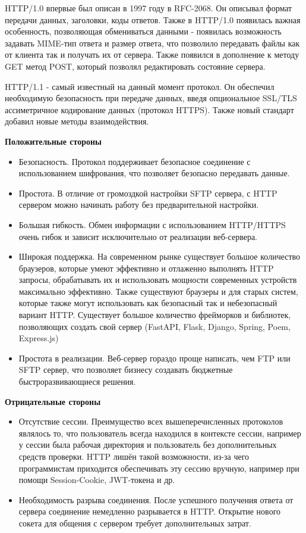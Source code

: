 \documentclass[a4paper,14pt]{extarticle}
\begin{document}
HTTP/1.0 впервые был описан в 1997 году в RFC-2068. Он описывал формат передачи данных, 
заголовки, коды ответов. Также в HTTP/1.0 появилась важная особенность, позволяющая 
обмениваться данными - появилась возможность задавать MIME-тип ответа и размер ответа, 
что позволило передавать файлы как от клиента так и получать их от сервера. Также
появился в дополнение к методу GET метод POST, который позволял редактировать состояние
сервера.

HTTP/1.1 - самый известный на данный момент протокол. Он обеспечил необходимую безопасность
при передаче данных, введя опциональное SSL/TLS ассиметричное кодирование данных (протокол HTTPS). Также
новый стандарт добавил новые методы взаимодействия.

\textbf{Положительные стороны}\\
\begin{itemize}
\item Безопасность. Протокол поддерживает безопасное соединение с использованием шифрования, 
что позволяет безопасно передавать данные.
\item Простота. В отличие от громоздкой настройки SFTP сервера, с HTTP сервером
можно начинать работу без предварительной настройки.
\item Большая гибкость. Обмен информации с использованием HTTP/HTTPS очень гибок и зависит 
исключительно от реализации веб-сервера. 
\item Широкая поддержка. На современном рынке существует большое количество браузеров, которые
умеют эффективно и отлаженно выполнять HTTP запросы, обрабатывать их и использовать мощности 
современных устройств максимально эффективно. Также существуют браузеры и для старых систем, 
которые также могут использовать как безопасный так и небезопасный вариант HTTP. Существует
большое количество фрейморков и библиотек, позволяющих создать свой сервер (FastAPI, Flask, Django, 
Spring, Poem, Express.js)
\item Простота в реализации. Веб-сервер гораздо проще написать, чем FTP или SFTP сервер, что
позволяет бизнесу создавать бюджетные быстроразвивающиеся решения.
\end{itemize}
\textbf{Отрицательные стороны}\\
\begin{itemize}
\item Отсутствие сессии. Преимущество всех вышеперечисленных протоколов являлось то, что пользователь
всегда находился в контексте сессии, например у сессии была рабочая директория и пользователь без дополнительных средств проверки. 
HTTP лишён такой возможности, из-за чего программистам приходится обеспечивать эту сессию вручную, например при помощи Session-Cookie, 
JWT-токена и др.
\item Необходимость разрыва соединения. После успешного получения ответа от сервера соединение немедленно 
разрывается в HTTP. Открытие нового сокета для общения с сервером требует дополнительных затрат.
\end{itemize}
\end{document}
